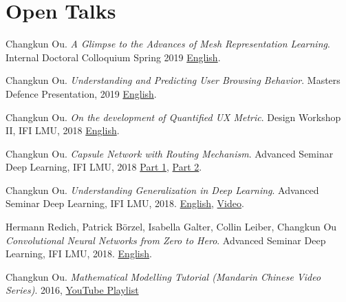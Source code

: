 \section{\textbf{Open Talks}}
 \resumeSubHeadingListStart
    \item{
      Changkun Ou.
      \emph{A Glimpse to the Advances of Mesh Representation Learning}.
      Internal Doctoral Colloquium Spring 2019 \href{https://github.com/changkun/talks/blob/master/201904/mesh.pdf}{English}.
    }
    \item{
      Changkun Ou.
      \emph{Understanding and Predicting User Browsing Behavior}.
      Masters Defence Presentation, 2019 \href{https://github.com/changkun/talks/blob/master/201901/master.pdf}{English}.
    }
    \item{
      Changkun Ou.
      \emph{On the development of Quantified UX Metric}.
      Design Workshop II, IFI LMU, 2018 \href{https://github.com/changkun/talks/blob/master/201805/qux.pdf}{English}.
    }
    \item{
      Changkun Ou.
      \emph{Capsule Network with Routing Mechanism}.
      Advanced Seminar Deep Learning, IFI LMU, 2018 \href{https://github.com/changkun/talks/blob/master/201712/capsnet1.pdf}{Part 1}, \href{https://github.com/changkun/talks/blob/master/201803/capsnet2.pdf}{Part 2}.
    }
    \item{
      Changkun Ou.
      \emph{Understanding Generalization in Deep Learning}.
      Advanced Seminar Deep Learning, IFI LMU, 2018. \href{https://docs.google.com/presentation/d/1eNUYH9_3bbBO7bONPU8BCTr2DOMC69gdOJvBgpLjwNg/edit#slide=id.g2cdf1dbd0b_1_6}{English}, \href{https://www.youtube.com/watch?v=z9je5YlnBgI&t=1585s}{Video}.
    }   
    \item{
      Hermann Redich, Patrick Börzel, Isabella Galter, Collin Leiber, Changkun Ou
      \emph{Convolutional Neural Networks from Zero to Hero}.
      Advanced Seminar Deep Learning, IFI LMU, 2018. \href{https://github.com/changkun/talks/blob/master/201712/cnn.pdf}{English}.
    }
    \item{
        Changkun Ou.
        \emph{Mathematical Modelling Tutorial (Mandarin Chinese Video Series)}.
        2016, \href{https://www.youtube.com/watch?v=EUfXE3vP9_A&list=PLwUqqMt5en7c7iZIseCVAS5BX6RPkS-qR}{YouTube Playlist}
    }
 \resumeSubHeadingListEnd